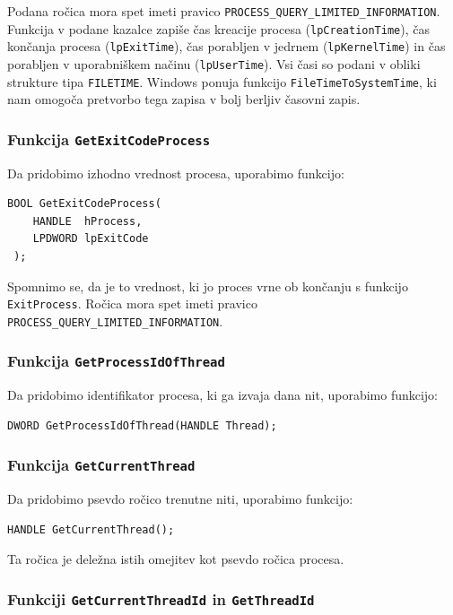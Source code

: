 \documentclass[a4paper,12pt,openright]{book}
\begin{document}
Podana ročica mora spet imeti pravico \texttt{PROCESS\_QUERY\_LIMITED\-\_INFOR\-MATION}.
Funkcija v podane kazalce zapiše čas kreacije procesa (\texttt{lpCreationTime}), čas končanja procesa (\texttt{lpExitTime}), čas porabljen v jedrnem (\texttt{lpKernelTime}) in čas porabljen v uporabniškem načinu (\texttt{lpUserTime}).
Vsi časi so podani v obliki strukture tipa \texttt{FILETIME}.
Windows ponuja funkcijo \texttt{FileTimeToSystem\-Time}, ki nam omogoča pretvorbo tega zapisa v bolj berljiv časovni zapis.

\subsubsection{Funkcija \texttt{GetExitCodeProcess}}

Da pridobimo izhodno vrednost procesa, uporabimo funkcijo:
\begin{lstlisting}[style=func]
 BOOL GetExitCodeProcess(
	HANDLE  hProcess,
	LPDWORD lpExitCode
 );
\end{lstlisting}

Spomnimo se, da je to vrednost, ki jo proces vrne ob končanju s funkcijo \texttt{ExitProcess}.
Ročica mora spet imeti pravico \texttt{PROCESS\_QUERY\_LIMITED\-\_INFORMATION}.

\subsubsection{Funkcija \texttt{GetProcessIdOfThread}}

Da pridobimo identifikator procesa, ki ga izvaja dana nit, uporabimo funkcijo:
\begin{lstlisting}[style=func]
 DWORD GetProcessIdOfThread(HANDLE Thread);
\end{lstlisting}

\subsubsection{Funkcija \texttt{GetCurrentThread}}

Da pridobimo psevdo ročico trenutne niti, uporabimo funkcijo:
\begin{lstlisting}[style=func]
 HANDLE GetCurrentThread();
\end{lstlisting}
Ta ročica je deležna istih omejitev kot psevdo ročica procesa.

\subsubsection{Funkciji \texttt{GetCurrentThreadId} in \texttt{GetThreadId}}
\end{document}

